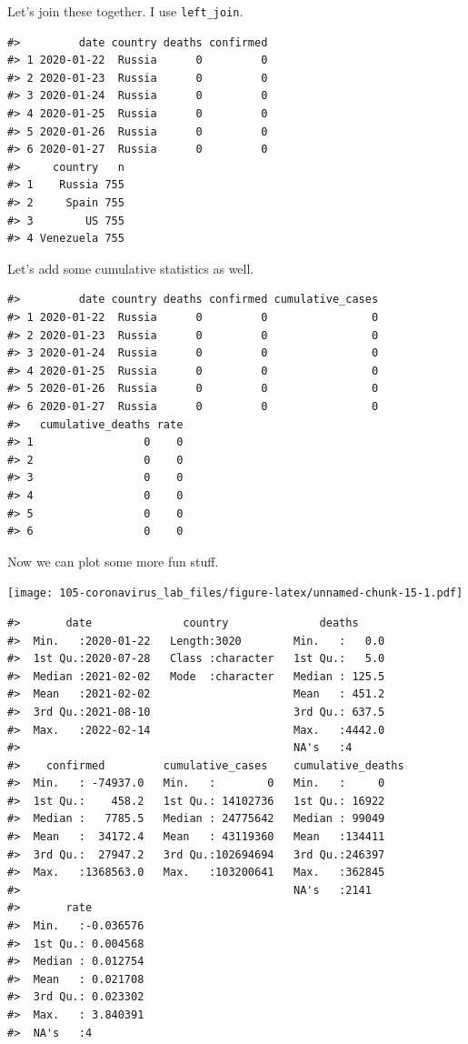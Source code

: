 \documentclass[
]{book}
\begin{document}
Let's join these together. I use \texttt{left\_join}.

\begin{verbatim}
#>         date country deaths confirmed
#> 1 2020-01-22  Russia      0         0
#> 2 2020-01-23  Russia      0         0
#> 3 2020-01-24  Russia      0         0
#> 4 2020-01-25  Russia      0         0
#> 5 2020-01-26  Russia      0         0
#> 6 2020-01-27  Russia      0         0
#>     country   n
#> 1    Russia 755
#> 2     Spain 755
#> 3        US 755
#> 4 Venezuela 755
\end{verbatim}

Let's add some cumulative statistics as well.

\begin{verbatim}
#>         date country deaths confirmed cumulative_cases
#> 1 2020-01-22  Russia      0         0                0
#> 2 2020-01-23  Russia      0         0                0
#> 3 2020-01-24  Russia      0         0                0
#> 4 2020-01-25  Russia      0         0                0
#> 5 2020-01-26  Russia      0         0                0
#> 6 2020-01-27  Russia      0         0                0
#>   cumulative_deaths rate
#> 1                 0    0
#> 2                 0    0
#> 3                 0    0
#> 4                 0    0
#> 5                 0    0
#> 6                 0    0
\end{verbatim}

Now we can plot some more fun stuff.

\texttt{[image: 105-coronavirus\_lab\_files/figure-latex/unnamed-chunk-15-1.pdf]}

\begin{verbatim}
#>       date              country              deaths      
#>  Min.   :2020-01-22   Length:3020        Min.   :   0.0  
#>  1st Qu.:2020-07-28   Class :character   1st Qu.:   5.0  
#>  Median :2021-02-02   Mode  :character   Median : 125.5  
#>  Mean   :2021-02-02                      Mean   : 451.2  
#>  3rd Qu.:2021-08-10                      3rd Qu.: 637.5  
#>  Max.   :2022-02-14                      Max.   :4442.0  
#>                                          NA's   :4       
#>    confirmed         cumulative_cases    cumulative_deaths
#>  Min.   : -74937.0   Min.   :        0   Min.   :     0   
#>  1st Qu.:    458.2   1st Qu.: 14102736   1st Qu.: 16922   
#>  Median :   7785.5   Median : 24775642   Median : 99049   
#>  Mean   :  34172.4   Mean   : 43119360   Mean   :134411   
#>  3rd Qu.:  27947.2   3rd Qu.:102694694   3rd Qu.:246397   
#>  Max.   :1368563.0   Max.   :103200641   Max.   :362845   
#>                                          NA's   :2141     
#>       rate          
#>  Min.   :-0.036576  
#>  1st Qu.: 0.004568  
#>  Median : 0.012754  
#>  Mean   : 0.021708  
#>  3rd Qu.: 0.023302  
#>  Max.   : 3.840391  
#>  NA's   :4
\end{verbatim}
\end{document}
